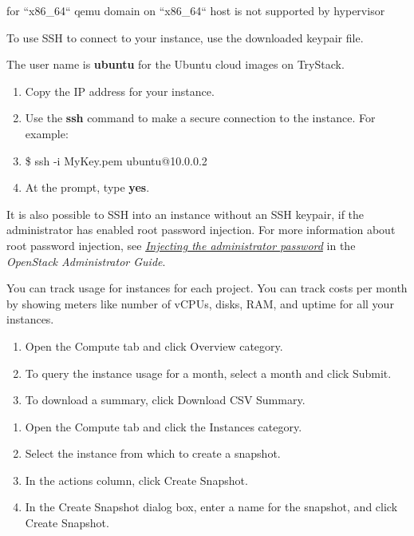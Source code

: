 for ``x86\_64`` qemu domain on ``x86\_64`` host is not supported by
hypervisor

\label{connect-to-your-instance-by-using-ssh}

To use SSH to connect to your instance, use the downloaded keypair file.

 The user name is \textbf{ubuntu} for the Ubuntu cloud
images on TryStack.

\begin{enumerate}
\def\labelenumi{\arabic{enumi}.}
\item Copy the IP address for your instance.
\item Use the \textbf{ssh} command to make a secure connection to the
  instance. For example:
\item \$ ssh -i MyKey.pem ubuntu@10.0.0.2
\item At the prompt, type \textbf{yes}.
\end{enumerate}

It is also possible to SSH into an instance without an SSH keypair, if
the administrator has enabled root password injection. For more
information about root password injection, see
\href{https://docs.openstack.org/nova/\osversion/admin/admin-password-injection.html}{\emph{Injecting the administrator password}} in the \emph{OpenStack Administrator
Guide}.

\label{track-usage-for-instances}

You can track usage for instances for each project. You can track costs
per month by showing meters like number of vCPUs, disks, RAM, and uptime
for all your instances.

\begin{enumerate}
\def\labelenumi{\arabic{enumi}.}
\item Open the Compute tab and click Overview category.
\item To query the instance usage for a month, select a month and click
  Submit.
\item To download a summary, click Download CSV Summary.
\end{enumerate}

\label{create-an-instance-snapshot}

\begin{enumerate}
\def\labelenumi{\arabic{enumi}.}
\item Open the Compute tab and click the Instances
  category.
\item Select the instance from which to create a snapshot.
\item In the actions column, click Create Snapshot.
\item In the Create Snapshot dialog box, enter a name for the snapshot, and
  click Create Snapshot.
\end{enumerate}

